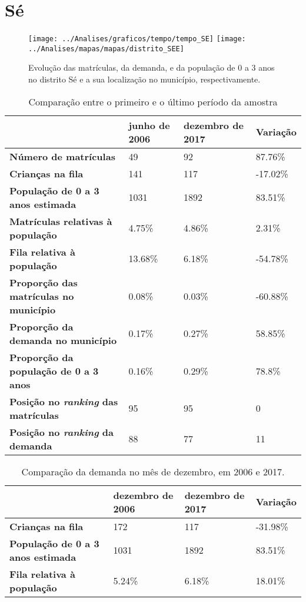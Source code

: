 \section{Sé}
\begin{figure}[H]
\centering
\texttt{[image: ../Analises/graficos/tempo/tempo\_SE]}
\texttt{[image: ../Analises/mapas/mapas/distrito\_SEE]}
\caption{Evolução das matrículas, da demanda, e da população de 0 a 3 anos no distrito Sé e a sua localização no município, respectivamente.}
\end{figure}
\begin{table}[H]
\begin{tabular}{l|l|l|l}
\textbf{}                                      & \textbf{junho de 2006}       & \textbf{dezembro de 2017}    & \textbf{Variação} \\ \hline
\textbf{Número de matrículas}                  & 49 & 92 & 87.76\% \\ \hline
\textbf{Crianças na fila}                      & 141 & 117 & -17.02\% \\ \hline
\textbf{População de 0 a 3 anos estimada}      & 1031 & 1892 & 83.51\% \\ \hline
\textbf{Matrículas relativas à população}      & 4.75\% & 4.86\% & 2.31\% \\ \hline
\textbf{Fila relativa à população}             & 13.68\% & 6.18\% & -54.78\% \\ \hline
\textbf{Proporção das matrículas no município} & 0.08\% & 0.03\% & -60.88\% \\ \hline
\textbf{Proporção da demanda no município}     & 0.17\% & 0.27\% & 58.85\% \\ \hline
\textbf{Proporção da população de 0 a 3 anos}  & 0.16\% & 0.29\% & 78.8\% \\ \hline
\textbf{Posição no \textit{ranking} das matrículas}     & 95 & 95 & 0 \\ \hline
\textbf{Posição no \textit{ranking} da demanda}         & 88 & 77 & 11 \\ 
\end{tabular}
\caption{Comparação entre o primeiro e o último período da amostra}
\end{table}
\begin{table}[H]
\begin{tabular}{l|l|l|l}
\textbf{}                                 & \textbf{dezembro de 2006} & \textbf{dezembro de 2017} & \textbf{Variação} \\ \hline
\textbf{Crianças na fila}                      & 172 & 117 & -31.98\% \\ \hline
\textbf{População de 0 a 3 anos estimada}      & 1031 & 1892 & 83.51\% \\ \hline
\textbf{Fila relativa à população}             & 5.24\% & 6.18\% & 18.01\% \\
\end{tabular}
\caption{Comparação da demanda no mês de dezembro, em 2006 e 2017.}
\end{table}
